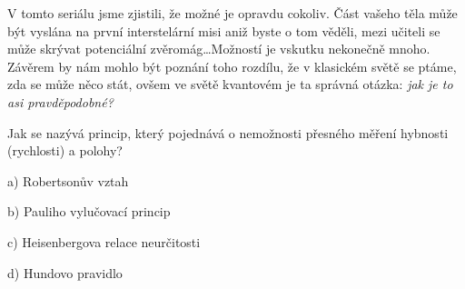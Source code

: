 \documentclass[crop=false]{standalone}
\begin{document}
V tomto seriálu jsme zjistili, že možné je opravdu cokoliv. Část vašeho těla může být vyslána na první interstelární misi aniž byste o tom věděli, mezi učiteli se může skrývat potenciální zvěromág\dots Možností je vskutku nekonečně mnoho. Závěrem by nám mohlo být poznání toho rozdílu, že v klasickém světě se ptáme, zda se může něco stát, ovšem ve světě kvantovém je ta správná otázka: \textit{jak je to asi pravděpodobné?}

Jak se nazývá princip, který pojednává o nemožnosti přesného měření hybnosti (rychlosti) a polohy?

a) Robertsonův vztah

b) Pauliho vylučovací princip

c) Heisenbergova relace neurčitosti

d) Hundovo pravidlo
\end{document}
